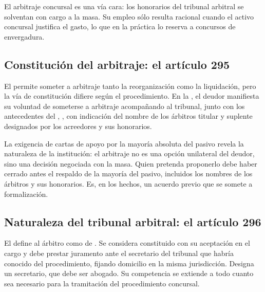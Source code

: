 \begin{alerta}
El arbitraje concursal es una vía cara: los honorarios del tribunal arbitral se solventan
con cargo a la masa. Su empleo sólo resulta racional cuando el activo concursal justifica
el gasto, lo que en la práctica lo reserva a concursos de envergadura.
\end{alerta}

\bloqueNormativo

\subsection{Constitución del arbitraje: el artículo 295}

El  permite someter a arbitraje tanto la reorganización como la liquidación, pero
la vía de constitución difiere según el procedimiento. En la , el
deudor manifiesta su voluntad de someterse a arbitraje acompañando al tribunal, junto con los
antecedentes del , , con indicación del nombre de los árbitros titular y
suplente designados por los acreedores y sus honorarios.

\begin{foco}
La exigencia de cartas de apoyo por la mayoría absoluta del pasivo revela la naturaleza de la
institución: el arbitraje no es una opción unilateral del deudor, sino una decisión negociada
con la masa. Quien pretenda proponerlo debe haber cerrado antes el respaldo de la mayoría del
pasivo, incluidos los nombres de los árbitros y sus honorarios. Es, en los hechos, un acuerdo
previo que se somete a formalización.
\end{foco}

\subsection{Naturaleza del tribunal arbitral: el artículo 296}

El  define al árbitro como de . Se considera
constituido con su aceptación en el cargo y debe prestar juramento ante el secretario del
tribunal que habría conocido del procedimiento, fijando domicilio en la misma jurisdicción.
Designa un secretario, que debe ser abogado. Su competencia se extiende a todo cuanto sea
necesario para la tramitación del procedimiento concursal.

